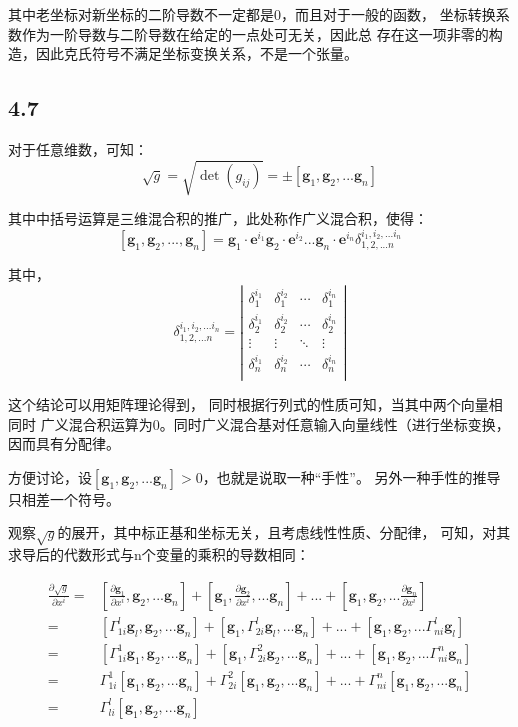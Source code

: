 \documentclass[UTF8,zihao=5]{ctexart}
\newcommand{\bm}[1]{{\mathbf{#1}}}
\newcommand*{\pd}[2]{\frac{\partial #1}{\partial #2}}
\begin{document}
其中老坐标对新坐标的二阶导数不一定都是0，而且对于一般的函数，
坐标转换系数作为一阶导数与二阶导数在给定的一点处可无关，因此总
存在这一项非零的构造，因此克氏符号不满足坐标变换关系，不是一个张量。

\subsection*{4.7}

对于任意维数，可知：
$$
    \sqrt{g}=\sqrt{\det(g_{ij})}=\pm[\bm{g}_1,\bm{g}_2,...\bm{g}_n]
$$

其中中括号运算是三维混合积的推广，此处称作广义混合积，使得：
$$
    [\bm{g}_1,\bm{g}_2,...,\bm{g}_n]
    =\bm{g}_1\cdot \bm{e}^{i_1}
    \bm{g}_2\cdot \bm{e}^{i_2}...
    \bm{g}_n\cdot \bm{e}^{i_n}
    \delta_{1,2,...n}^{i_1,i_2,...i_n}
$$

其中，
$$
    \delta_{1,2,...n}^{i_1,i_2,...i_n}
    =
    \left|\begin{matrix}
        \delta_1^{i_1} & \delta_1^{i_2} & \cdots & \delta_1^{i_n} \\
        \delta_2^{i_1} & \delta_2^{i_2} & \cdots & \delta_2^{i_n} \\
        \vdots         & \vdots         & \ddots & \vdots         \\
        \delta_n^{i_1} & \delta_n^{i_2} & \cdots & \delta_n^{i_n} \\
    \end{matrix}\right|
$$

这个结论可以用矩阵理论得到，
同时根据行列式的性质可知，当其中两个向量相同时
广义混合积运算为0。同时广义混合基对任意输入向量线性（进行坐标变换，因而具有分配律。

方便讨论，设$[\bm{g}_1,\bm{g}_2,...\bm{g}_n]>0$，也就是说取一种“手性”。
另外一种手性的推导只相差一个符号。

观察$\sqrt{g}$的展开，其中标正基和坐标无关，且考虑线性性质、分配律，
可知，对其求导后的代数形式与n个变量的乘积的导数相同：

$$
    \begin{aligned}
        \pd{\sqrt{g}}{x^i}= &
        [\pd{\bm{g}_1}{x^i}, \bm{g}_2,...\bm{g}_n]
        +[\bm{g}_1, \pd{\bm{g}_2}{x^i},...\bm{g}_n]+...
        +[\bm{g}_1, \bm{g}_2,...\pd{\bm{g}_n}{x^i}]    \\
        =                   &
        [\Gamma^l_{1i}\bm{g}_l, \bm{g}_2,...\bm{g}_n]
        +[\bm{g}_1, \Gamma^l_{2i}\bm{g}_l,...\bm{g}_n]+...
        +[\bm{g}_1, \bm{g}_2,...\Gamma^l_{ni}\bm{g}_l] \\
        =                   &
        [\Gamma^1_{1i}\bm{g}_1, \bm{g}_2,...\bm{g}_n]
        +[\bm{g}_1, \Gamma^2_{2i}\bm{g}_2,...\bm{g}_n]+...
        +[\bm{g}_1, \bm{g}_2,...\Gamma^n_{ni}\bm{g}_n]\\
        =                   &
        \Gamma^1_{1i}[\bm{g}_1, \bm{g}_2,...\bm{g}_n]
        +\Gamma^2_{2i}[\bm{g}_1, \bm{g}_2,...\bm{g}_n]+...
        +\Gamma^n_{ni}[\bm{g}_1, \bm{g}_2,...\bm{g}_n]\\
        =                   &
        \Gamma^l_{li}[\bm{g}_1, \bm{g}_2,...\bm{g}_n]
    \end{aligned}
$$
\end{document}
